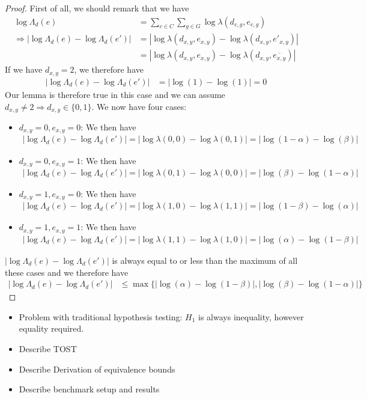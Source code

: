 \begin{proof}
    First of all, we should remark that we have
    \begin{align*}
        \log\Lambda_d(e) &= \sum_{c \in C} \sum_{g \in G} \log\lambda(d_{c,g}, e_{c,g}) \\
        \Rightarrow |\log\Lambda_d(e) - \log\Lambda_d(e')| &= |\log\lambda(d_{x,y}, e_{x,y}) - \log\lambda(d_{x,y}, e'_{x,y})| \\
        &= |\log\lambda(d_{x,y}, e_{x,y}) - \log\lambda(d_{x,y}, \overline{e_{x,y}})|
    \end{align*}
    If we have $d_{x,y} = 2$, we therefore have
    \begin{align*}
        |\log\Lambda_d(e) - \log\Lambda_d(e')| &= |\log(1) - \log(1)| = 0
    \end{align*}
    Our lemma is therefore true in this case and we can assume $d_{x,y} \neq 2 \Rightarrow d_{x,y} \in \{0,1\}$. We now have four cases:
    \begin{itemize}
        \item $d_{x,y} = 0, e_{x,y} = 0$: We then have
        \begin{align*}
            |\log\Lambda_d(e) - \log\Lambda_d(e')| = |\log\lambda(0,0) - \log\lambda(0,1)| = |\log(1-\alpha) - \log(\beta)|
        \end{align*}
        \item $d_{x,y} = 0, e_{x,y} = 1$: We then have
        \begin{align*}
            |\log\Lambda_d(e) - \log\Lambda_d(e')| = |\log\lambda(0,1) - \log\lambda(0,0)| = |\log(\beta) - \log(1-\alpha)|
        \end{align*}
        \item $d_{x,y} = 1, e_{x,y} = 0$: We then have
        \begin{align*}
            |\log\Lambda_d(e) - \log\Lambda_d(e')| = |\log\lambda(1,0) - \log\lambda(1,1)| = |\log(1-\beta) - \log(\alpha)|
        \end{align*}
        \item $d_{x,y} = 1, e_{x,y} = 1$: We then have
        \begin{align*}
            |\log\Lambda_d(e) - \log\Lambda_d(e')| = |\log\lambda(1,1) - \log\lambda(1,0)| = |\log(\alpha) - \log(1-\beta)|
        \end{align*}
    \end{itemize}
    $|\log\Lambda_d(e) - \log\Lambda_d(e')|$ is always equal to or less than the maximum of all these cases and we therefore have
    \begin{align*}
        |\log\Lambda_d(e) - \log\Lambda_d(e')| &\leq \max\{|\log(\alpha) - \log(1-\beta)|, |\log(\beta) - \log(1-\alpha)|\}
    \end{align*}
\end{proof}


\begin{itemize}
    \item Problem with traditional hypothesis testing: $H_1$ is always inequality, however equality required.
    \item Describe TOST
    \item Describe Derivation of equivalence bounds
    \item Describe benchmark setup and results
\end{itemize}